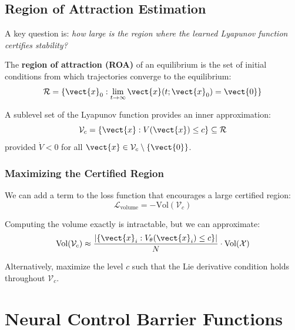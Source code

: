 \subsection{Region of Attraction Estimation}

A key question is: \textit{how large is the region where the learned Lyapunov function certifies stability?}

\begin{definition}
The \textbf{region of attraction (ROA)} of an equilibrium is the set of initial conditions from which trajectories converge to the equilibrium:
\begin{equation}
\mathcal{R} = \{\vect{x}_0 : \lim_{t \to \infty} \vect{x}(t; \vect{x}_0) = \vect{0}\}
\end{equation}
\end{definition}

A sublevel set of the Lyapunov function provides an inner approximation:
\begin{equation}
\mathcal{V}_c = \{\vect{x} : V(\vect{x}) \leq c\} \subseteq \mathcal{R}
\label{eq:sublevel_set}
\end{equation}
provided $\dot{V} < 0$ for all $\vect{x} \in \mathcal{V}_c \setminus \{\vect{0}\}$.

\subsubsection{Maximizing the Certified Region}

We can add a term to the loss function that encourages a large certified region:
\begin{equation}
\mathcal{L}_{\text{volume}} = -\text{Vol}(\mathcal{V}_c)
\end{equation}

Computing the volume exactly is intractable, but we can approximate:
\begin{equation}
\text{Vol}(\mathcal{V}_c) \approx \frac{|\{\vect{x}_i : V_\theta(\vect{x}_i) \leq c\}|}{N} \cdot \text{Vol}(\mathcal{X})
\end{equation}

Alternatively, maximize the level $c$ such that the Lie derivative condition holds throughout $\mathcal{V}_c$.

\section{Neural Control Barrier Functions}
\label{sec:neural_cbf}

